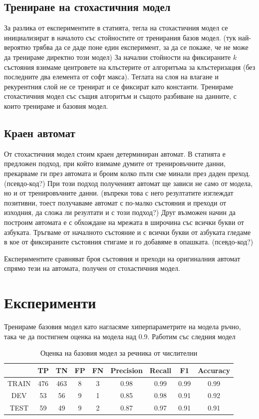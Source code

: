 \documentclass[a4paper,12pt]{article}
\begin{document}
\subsection{Трениране на стохастичния модел}

За разлика от експериментите в статията, тегла на стохастичния модел се инициализират в началото със стойностите от тренирания базов модел. (тук най-вероятно трябва да се даде поне един експеримент, за да се покаже, че не може да тренираме директно този модел) За начални стойности на фиксираните $k$ състояния взимаме центровете на клъстерите от алгоритъма за клъстеризация (без последните два елемента от софт макса). Теглата на слоя на влагане и рекурентния слой не се тренират и се фиксират като константи. Тренираме стохастичния модел със същия алгоритъм и същото разбиване на данните, с които тренираме и базовия модел.

\subsection{Краен автомат}

От стохастичния модел стоим краен детерминиран автомат. В статията \cite{citation06} е предложен подход, при който взимаме думите от тренировъчните данни, прекарваме ги през автомата и броим колко пъти сме минали през даден преход.(псевдо-код?) При този подход полученият автомат ще зависи не само от модела, но и от тренировъчните данни. (въпреки това с него резултатите изглеждат позитивни, тоест получаваме автомат с по-малко състояния и преходи от изходния, да сложа ли резултати и с този подход?)
Друг възможен начин да построим автомата е с обхождане на мрежата в широчина със всички букви от азбуката. Тръгваме от началното състояние и с всички букви от азбуката гледаме в кое от фиксираните състояния стигаме и го добавяме в опашката. (псевдо-код?)

Експериментите сравняват броя състояния и преходи на оригиналния автомат спрямо тези на автомата, получен от стохастичния модел. 

\pagebreak

\section{Експерименти}


Тренираме базовия модел като нагласяме хиперпараметрите на модела ръчно, така че да постигнем оценка на модела над 0.9. Работим със следния модел

\begin{table}[h!]
\centering
\begin{tabular}{|c|c|c|c|c|c|c|c|c|}
\hline
 & TP & TN & FP & FN & Precision & Recall & F1 & Accuracy\\
\hline
TRAIN & 476 & 463 & 8 & 3 & 0.98 & 0.99 & 0.99 & 0.99\\
\hline
DEV & 53 & 56 & 9 & 1 & 0.85 & 0.98 & 0.91 & 0.92\\
\hline
TEST & 59 & 49 & 9 & 2 & 0.87 & 0.97 & 0.91 & 0.91\\
\hline
\end{tabular}
\caption{Оценка на базовия модел за речника от числителни}
\label{table:5}
\end{table}
\end{document}
